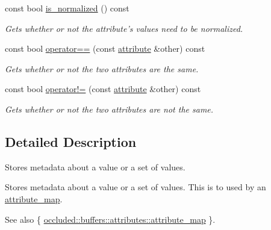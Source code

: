 \begin{DoxyCompactItemize}
const bool \hyperlink{classoccluded_1_1buffers_1_1attributes_1_1attribute_a6e06ee8031036c777442922a5a0be680}{is\+\_\+normalized} () const 
\begin{DoxyCompactList}\small\item\em Gets whether or not the attribute's values need to be normalized. \end{DoxyCompactList}\item 
const bool \hyperlink{classoccluded_1_1buffers_1_1attributes_1_1attribute_a4e5897c884ac34635613576b633189e7}{operator==} (const \hyperlink{classoccluded_1_1buffers_1_1attributes_1_1attribute}{attribute} \&other) const 
\begin{DoxyCompactList}\small\item\em Gets whether or not the two attributes are the same. \end{DoxyCompactList}\item 
const bool \hyperlink{classoccluded_1_1buffers_1_1attributes_1_1attribute_affa4220bf465a8d2aa2a32569a5e2ea7}{operator!=} (const \hyperlink{classoccluded_1_1buffers_1_1attributes_1_1attribute}{attribute} \&other) const 
\begin{DoxyCompactList}\small\item\em Gets whether or not the two attributes are not the same. \end{DoxyCompactList}\end{DoxyCompactItemize}


\subsection{Detailed Description}
Stores metadata about a value or a set of values. 

Stores metadata about a value or a set of values. This is to used by an \hyperlink{classoccluded_1_1buffers_1_1attributes_1_1attribute__map}{attribute\+\_\+map}. \begin{DoxySeeAlso}{See also}
\{ \hyperlink{classoccluded_1_1buffers_1_1attributes_1_1attribute__map}{occluded\+::buffers\+::attributes\+::attribute\+\_\+map} \}. 
\end{DoxySeeAlso}


